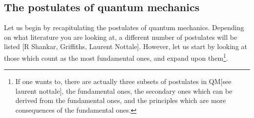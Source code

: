 \subsection{The postulates of quantum mechanics}
Let us begin by recapitulating the postulates of quantum mechanics. Depending on what literature you are looking at, a different number of postulates will be listed [R Shankar, Griffiths, Laurent Nottale]. However, let us start by looking at those which count as the most fundamental ones, and expand upon them\footnote{If one wants to, there are actually three subsets of postulates in QM[see laurent nottale], the fundamental ones, the secondary ones which can be derived from the fundamental ones, and the principles which are more consequences of the fundamental ones.}.

